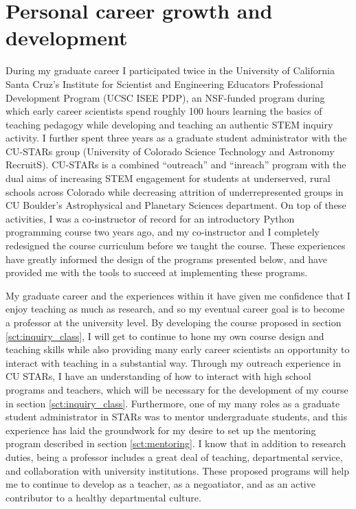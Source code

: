\documentclass[11pt, preprint]{aastex}
\begin{document}
\section{Personal career growth and development}
\label{sct:personal_growth}
During my graduate career I participated twice in the University of California Santa Cruz's Institute for Scientist and Engineering Educators Professional Development Program (UCSC ISEE PDP), an NSF-funded program during which early career scientists spend roughly 100 hours learning the basics of teaching pedagogy while developing and teaching an authentic STEM inquiry activity.
I further spent three years as a graduate student administrator with the CU-STARs group (University of Colorado Science Technology and Astronomy RecruitS).
CU-STARs is a combined ``outreach'' and ``inreach'' program with the dual aims of increasing STEM engagement for students at underserved, rural schools across Colorado while decreasing attrition of underrepresented groups in CU Boulder's Astrophysical and Planetary Sciences department.
On top of these activities, I was a co-instructor of record for an introductory Python programming course two years ago, and my co-instructor and I completely redesigned the course curriculum before we taught the course.
These experiences have greatly informed the design of the programs presented below, and have provided me with the tools to succeed at implementing these programs.

My graduate career and the experiences within it have given me confidence that I enjoy teaching as much as research, and so my eventual career goal is to become a professor at the university level.
By developing the course proposed in section \ref{sct:inquiry_class}, I will get to continue to hone my own course design and teaching skills while also providing many early career scientists an opportunity to interact with teaching in a substantial way.
Through my outreach experience in CU STARs, I have an understanding of how to interact with high school programs and teachers, which will be necessary for the development of my course in section \ref{sct:inquiry_class}.
Furthermore, one of my many roles as a graduate student administrator in STARs was to mentor undergraduate students, and this experience has laid the groundwork for my desire to set up the mentoring program described in section \ref{sct:mentoring}.
I know that in addition to research duties, being a professor includes a great deal of teaching, departmental service, and collaboration with university institutions.
These proposed programs will help me to continue to develop as a teacher, as a negoatiator, and as an active contributor to a healthy departmental culture.
\end{document}
